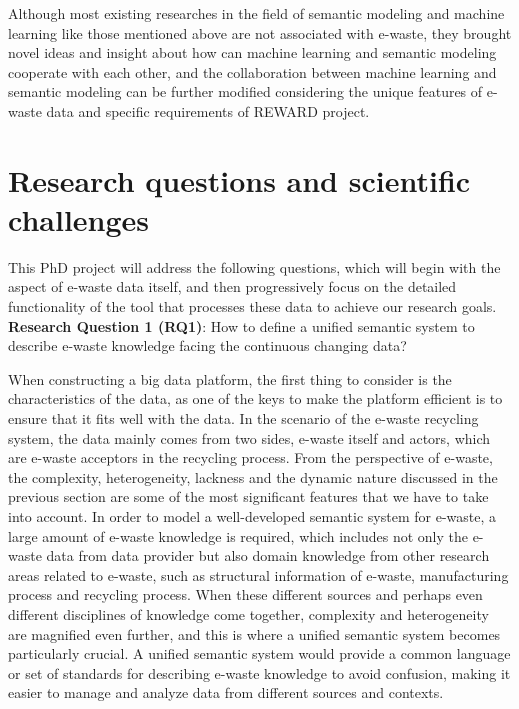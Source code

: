 \documentclass{article}
\numberwithin{equation}{section}
\begin{document}
Although most existing researches in the field of semantic modeling and machine learning like those mentioned above are not associated with e-waste, they brought novel ideas and insight about how can machine learning and semantic modeling cooperate with each other, and the collaboration between machine learning and semantic modeling can be further modified considering the unique features of e-waste data and specific requirements of REWARD project. 

\section{Research questions and scientific challenges}
This PhD project will address the following questions, which will begin with the aspect of e-waste data itself, and then progressively focus on the detailed functionality of the tool that processes these data to achieve our research goals. \\

\textbf{Research Question 1 (RQ1)}: How to define a unified semantic system to describe e-waste knowledge facing the continuous changing data?

When constructing a big data platform, the first thing to consider is the characteristics of the data, as one of the keys to make the platform efficient is to ensure that it fits well with the data. In the scenario of the e-waste recycling system, the data mainly comes from two sides, e-waste itself and actors, which are e-waste acceptors in the recycling process. From the perspective of e-waste, the complexity, heterogeneity, lackness and the dynamic nature discussed in the previous section are some of the most significant features that we have to take into account. In order to model a well-developed semantic system for e-waste, a large amount of e-waste knowledge is required, which includes not only the e-waste data from data provider but also domain knowledge from other research areas related to e-waste, such as structural information of e-waste, manufacturing process and recycling process. When these different sources and perhaps even different disciplines of knowledge come together, complexity and heterogeneity are magnified even further, and this is where a unified semantic system becomes particularly crucial. A unified semantic system would provide a common language or set of standards for describing e-waste knowledge to avoid confusion, making it easier to manage and analyze data from different sources and contexts.
\end{document}
